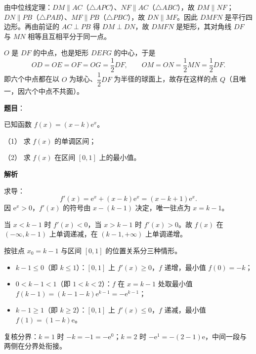 \begin{answer}
由中位线定理：$DM\parallel AC$（$\triangle APC$）、$NF\parallel AC$（$\triangle ABC$），故 $DM\parallel NF$；$DN\parallel PB$（$\triangle PAB$）、$MF\parallel PB$（$\triangle PBC$），故 $DN\parallel MF$。因此 $DMFN$ 是平行四边形。再由前证的 $AC\perp PB$ 得 $DM\perp DN$，故 $DMFN$ 是矩形，其对角线 $DF$ 与 $MN$ 相等且互相平分于同一点。

$O$ 是 $DF$ 的中点，也是矩形 $DEFG$ 的中心，于是
\nopagebreak[4]
\[
OD=OE=OF=OG=\frac12DF,
\qquad
OM=ON=\frac12MN=\frac12DF.
\]
即六个中点都在以 $O$ 为球心、$\dfrac12DF$ 为半径的球面上，故存在这样的点 $Q$（且唯一，因六个中点不共面）。




\end{answer}
\begin{answer}

\textbf{题目}：

已知函数 $f(x)=(x-k)\mathrm{e}^x$。

（1） 求 $f(x)$ 的单调区间；

（2） 求 $f(x)$ 在区间 $[0,1]$ 上的最小值。

\textbf{解析}

求导：
\nopagebreak[4]
\[
f'(x)=\mathrm{e}^x+(x-k)\mathrm{e}^x=(x-k+1)\mathrm{e}^x.
\]
因 $\mathrm{e}^x>0$，$f'(x)$ 的符号由 $x-(k-1)$ 决定，唯一驻点为 $x=k-1$。


当 $x<k-1$ 时 $f'(x)<0$，当 $x>k-1$ 时 $f'(x)>0$。故 $f(x)$ 在 $(-\infty,k-1)$ 上单调递减，在 $(k-1,+\infty)$ 上单调递增。


按驻点 $x_0=k-1$ 与区间 $[0,1]$ 的位置关系分三种情形。

\begin{itemize}
\item $k-1\leqslant0$（即 $k\leqslant1$）：$[0,1]$ 上 $f'(x)\geqslant0$，$f$ 递增，最小值 $f(0)=-k$；
\item $0<k-1<1$（即 $1<k<2$）：$f$ 在 $x=k-1$ 处取最小值 $f(k-1)=(k-1-k)\mathrm{e}^{k-1}=-\mathrm{e}^{k-1}$；
\item $k-1\geqslant1$（即 $k\geqslant2$）：$[0,1]$ 上 $f'(x)\leqslant0$，$f$ 递减，最小值 $f(1)=(1-k)\mathrm{e}$。
\end{itemize}

复核分界：$k=1$ 时 $-k=-1=-\mathrm{e}^{0}$；$k=2$ 时 $-\mathrm{e}^{1}=-(2-1)\mathrm{e}$，中间一段与两侧在分界处衔接。



\end{answer}
